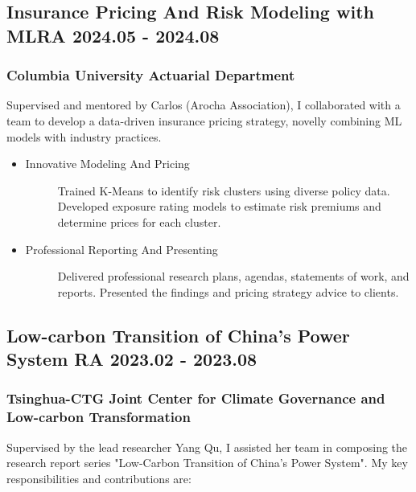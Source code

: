 \documentclass[10.5pt,a4paper]{article}
\begin{document}
\hypertarget{integrated-project}{
    \subsection{Insurance Pricing And Risk Modeling with ML\normalfont \hfill RA \hspace{40pt} 2024.05 - 2024.08}}
\subsubsection{Columbia University Actuarial Department} 
\vspace{3pt}
Supervised and mentored by Carlos (Arocha Association), I collaborated with a team to develop a data-driven insurance pricing strategy, novelly combining ML models with industry practices.
\begin{itemize}
    \item\begin{description}
        \item[Innovative Modeling And Pricing] Trained K-Means to identify risk clusters using diverse policy data. Developed exposure rating models to estimate risk premiums and determine prices for each cluster. 
    \end{description}
    \item\begin{description}
        \item[Professional Reporting And Presenting] Delivered professional research plans, agendas, statements of work, and reports. Presented the findings and pricing strategy advice to clients. 
    \end{description}
\end{itemize} 

\subsection{Low-carbon Transition of China's Power System \normalfont \hfill RA \hspace{40pt} 2023.02 - 2023.08} 
\subsubsection{Tsinghua-CTG Joint Center for Climate Governance and Low-carbon Transformation} 
\vspace{3pt}
    Supervised by the lead researcher Yang Qu, I assisted her team in composing the research report series "Low-Carbon Transition of China’s Power System". My key responsibilities and contributions are:
\end{document}
